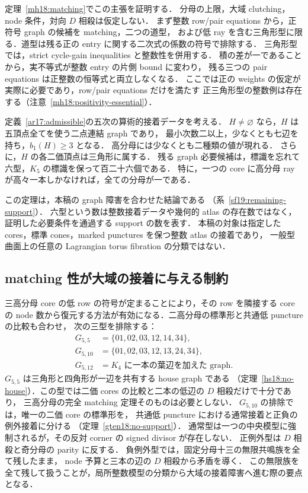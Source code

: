定理~\ref{mh18:matching}でこの主張を証明する．
分母の上限，大域 clutching，node 条件，対向 $D$ 相殺は仮定しない．
まず整数 row/pair equations から，正符号 graph の候補を matching，二つの道型，
および低 ray を含む三角形型に限る．道型は残る正の entry に関する二次式の係数の符号で排除する．
三角形型では，strict cycle-gain inequalities と整数性を併用する．
積の差が一であることから，実不等式が整数 entry の片側 bound に変わり，
残る三つの pair equations は正整数の恒等式と両立しなくなる．
ここでは正の weights の仮定が実際に必要であり，row/pair equations だけを満たす
正三角形型の整数例は存在する（注意~\ref{mh18:positivity-essential}）．

\begin{theorem}
\label{ar17:main-support}
定義~\ref{ar17:admissible}の五次の算術的接着データを考える．
$H\ne\varnothing$ なら，$H$ は五頂点全てを使う二点連結 graph であり，
最小次数二以上，少なくとも七辺を持ち，$b_1(H)\ge3$ となる．
高分母には少なくとも二種類の値が現れる．
さらに，$H$ の各二価頂点は三角形に属する．
残る graph 必要候補は，標識を忘れて六型，$K_5$ の標識を保って百二十六個である．
特に，一つの core に高分母 ray が高々一本しかなければ，全ての分母が一である．
\end{theorem}

この定理は，本稿の graph 障害を合わせた結論である
（系~\ref{sf19:remaining-support}）．
六型という数は整数接着データや幾何的 atlas の存在数ではなく，
証明した必要条件を通過する support の数を表す．
本稿の対象は指定した cores，標準 cones，marked punctures を保つ整数 atlas の接着であり，
一般型曲面上の任意の Lagrangian torus fibration の分類ではない．

\subsection{matching 性が大域の接着に与える制約}

三高分母 core の低 row の符号が定まることにより，その row を隣接する core の
node 数から復元する方法が有効になる．二高分母の標準形と共通低 puncture の比較も合わせ，
次の三型を排除する：
\[
 \begin{split}
 G_{5,5}&=\{01,02,03,12,14,34\},\\
 G_{5,10}&=\{01,02,03,12,13,24,34\},\\
 G_{5,12}&=K_4\text{ に一本の葉辺を加えた graph}.
 \end{split}
\]
$G_{5,5}$ は三角形と四角形が一辺を共有する house graph である
（定理~\ref{hs18:no-house}）．この型では二価 cores の比較と二本の低辺の $D$ 相殺だけで十分であり，
三高分母の完全 matching 定理そのものは必要としない．
$G_{5,10}$ の排除では，唯一の二価 core の標準形を，
共通低 puncture における通常接着と正負の例外接着に分ける
（定理~\ref{gten18:no-support}）．
通常型は一つの中央模型に強制されるが，その反対 corner の signed divisor が存在しない．
正例外型は $D$ 相殺と奇分母の parity に反する．
負例外型では，固定分母十三の無限共鳴族を全て残したまま，
node 予算と三本の辺の $D$ 相殺から矛盾を導く．
この無限族を全て残して扱うことが，局所整数模型の分類から大域の接着障害へ進む際の要点となる．


